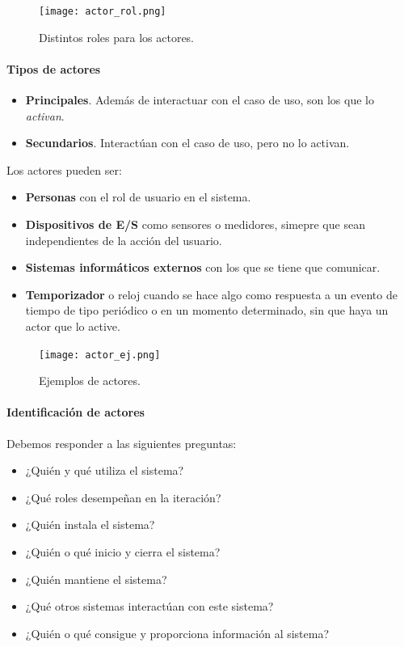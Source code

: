 \documentclass[12pt,spanish]{article}
\begin{document}
\begin{figure}[H]
	\centering
	\texttt{[image: actor\_rol.png]}
	\caption{Distintos roles para los actores.}
\end{figure}
	
\paragraph{Tipos de actores}

\begin{itemize}
	\item \textbf{Principales}. Además de interactuar con el caso de uso, son los que lo \emph{activan}.
	\item \textbf{Secundarios}. Interactúan con el caso de uso, pero no lo activan.
\end{itemize}

Los actores pueden ser:

\begin{itemize}
	\item \textbf{Personas} con el rol de usuario en el sistema.
	\item \textbf{Dispositivos de E/S} como sensores o medidores, simepre que sean independientes de la acción del usuario.
	\item \textbf{Sistemas informáticos externos} con los que se tiene que comunicar.
	\item \textbf{Temporizador} o reloj cuando se hace algo como respuesta a un evento de tiempo de tipo periódico o en un momento determinado, sin que haya un actor que lo active.
\end{itemize}

\begin{figure}[H]
	\centering
	\texttt{[image: actor\_ej.png]}
	\caption{Ejemplos de actores.}
\end{figure}

\paragraph{Identificación de actores}
Debemos responder a las siguientes preguntas:
\begin{itemize}
	\item ¿Quién y qué utiliza el sistema?
	\item ¿Qué roles desempeñan en la iteración?
	\item ¿Quién instala el sistema?
	\item ¿Quién o qué inicio y cierra el sistema?
	\item ¿Quién mantiene el sistema?
	\item ¿Qué otros sistemas interactúan con este sistema?
	\item ¿Quién o qué consigue y proporciona información al sistema?
\end{itemize}
\end{document}

